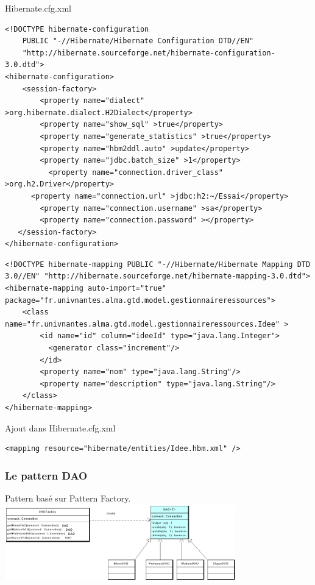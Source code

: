 \begin{frame}[fragile]
Hibernate.cfg.xml
\lstset{breaklines=true, basicstyle=\footnotesize ,  language=XML}
\begin{lstlisting}
<!DOCTYPE hibernate-configuration
    PUBLIC "-//Hibernate/Hibernate Configuration DTD//EN"
    "http://hibernate.sourceforge.net/hibernate-configuration-3.0.dtd">
<hibernate-configuration>
    <session-factory>
        <property name="dialect" >org.hibernate.dialect.H2Dialect</property>
        <property name="show_sql" >true</property>
        <property name="generate_statistics" >true</property>
        <property name="hbm2ddl.auto" >update</property>
        <property name="jdbc.batch_size" >1</property>
     	  <property name="connection.driver_class" >org.h2.Driver</property>
   	  <property name="connection.url" >jdbc:h2:~/Essai</property>
        <property name="connection.username" >sa</property>
        <property name="connection.password" ></property>
   </session-factory>
</hibernate-configuration>
\end{lstlisting}
\end{frame}

\begin{frame}[fragile]
\lstset{breaklines=true, basicstyle=\footnotesize ,  language=XML}
\begin{lstlisting}
<!DOCTYPE hibernate-mapping PUBLIC "-//Hibernate/Hibernate Mapping DTD 3.0//EN" "http://hibernate.sourceforge.net/hibernate-mapping-3.0.dtd">
<hibernate-mapping auto-import="true" package="fr.univnantes.alma.gtd.model.gestionnaireressources">
    <class name="fr.univnantes.alma.gtd.model.gestionnaireressources.Idee" >
        <id name="id" column="ideeId" type="java.lang.Integer">
          <generator class="increment"/>
        </id>
        <property name="nom" type="java.lang.String"/>
        <property name="description" type="java.lang.String"/>
    </class>
</hibernate-mapping>
\end{lstlisting}
\pause
Ajout dans Hibernate.cfg.xml
\begin{lstlisting}
<mapping resource="hibernate/entities/Idee.hbm.xml" />
\end{lstlisting}
\end{frame}

\begin{frame}
\frametitle{Le pattern DAO}
Pattern bas\'e sur Pattern Factory.\\
\includegraphics[width=10cm]{images/PatternDAOIdeal}
\end{frame}

